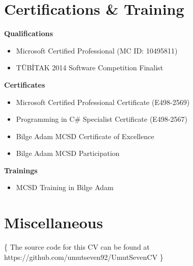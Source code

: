\documentclass[11pt,a4paper,sans]{moderncv}        %
\begin{document}
\section{Certifications \& Training}
\vspace{5px}

\textbf{Qualifications}
\begin{itemize}
\item Microsoft Certified Professional (MC ID: 10495811)
\item TÜBİTAK 2014 Software Competition Finalist\newline{}
\end{itemize}
\textbf{Certificates}
\begin{itemize}
\item Microsoft Certified Professional Certificate (E498-2569)
\item Programming in C\# Specialist Certificate (E498-2567)
\item Bilge Adam MCSD Certificate of Excellence
\item Bilge Adam MCSD Participation\newline{}
\end{itemize}

\textbf{Trainings}
\begin{itemize}
\item MCSD Training in Bilge Adam\newline{}
\end{itemize}

\vspace{5px}


\section{Miscellaneous}
\vspace{5px}


               
\vspace*{\fill}
\color{color2} \centerline{\{ The source code for this CV can be found at https://github.com/umutseven92/UmutSevenCV \}}
\end{document}
